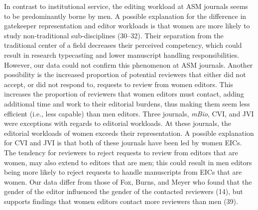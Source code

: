\documentclass[11pt,]{article}
\begin{document}
In contrast to institutional service, the editing workload at ASM
journals seems to be predominantly borne by men. A possible explanation
for the difference in gatekeeper representation and editor workloads is
that women are more likely to study non-traditional sub-disciplines
(30--32). Their separation from the traditional center of a field
decreases their perceived competency, which could result in research
typecasting and lower manuscript handling responsibilities. However, our
data could not confirm this phenomenon at ASM journals. Another
possibility is the increased proportion of potential reviewers that
either did not accept, or did not respond to, requests to review from
women editors. This increases the proportion of reviewers that women
editors must contact, adding additional time and work to their editorial
burdens, thus making them seem less efficient (i.e., less capable) than
men editors. Three journals, \emph{mBio}, CVI, and JVI were exceptions
with regards to editorial workloads. At these journals, the editorial
workloads of women exceeds their representation. A possible explanation
for CVI and JVI is that both of these journals have been led by women
EICs. The tendency for reviewers to reject requests to review from
editors that are women, may also extend to editors that are men; this
could result in men editors being more likely to reject requests to
handle manuscripts from EICs that are women. Our data differ from those
of Fox, Burns, and Meyer who found that the gender of the editor
influenced the gender of the contacted reviewers (14), but supports
findings that women editors contact more reviewers than men (39).
\end{document}
